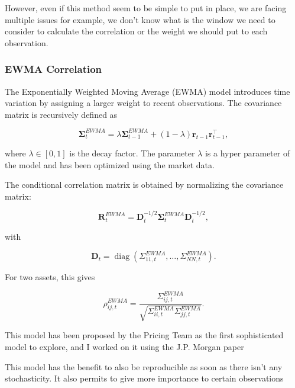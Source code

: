 \documentclass{article}
\begin{document}
However, even if this method seem to be simple to put in place, we are facing multiple issues for example, we don't know what is the window we need to consider to calculate the correlation or the weight we should put to each observation.

\subsubsection{EWMA Correlation}

The Exponentially Weighted Moving Average (EWMA) model introduces time variation by assigning a larger weight to recent observations. The covariance matrix is recursively 
defined as

\begin{equation}
\mathbf{\Sigma}_t^{EWMA}
=
\lambda\mathbf{\Sigma}_{t-1}^{EWMA}
+
(1-\lambda)
\bm{r}_{t-1}\bm{r}_{t-1}^{\top},
\end{equation}

where $\lambda\in[0,1]$ is the decay factor. The parameter $\lambda$ is a hyper parameter of the model and has been optimized using the market data.

The conditional correlation matrix is obtained by normalizing the covariance matrix:

\begin{equation}
\mathbf{R}_t^{EWMA}
=
\mathbf{D}_t^{-1/2}
\mathbf{\Sigma}_t^{EWMA}
\mathbf{D}_t^{-1/2},
\end{equation}

with

\begin{equation}
\mathbf{D}_t
=
\operatorname{diag}
\left(
\Sigma_{11,t}^{EWMA},
\ldots,
\Sigma_{NN,t}^{EWMA}
\right).
\end{equation}

For two assets, this gives

\begin{equation}
\rho_{ij,t}^{EWMA}
=
\frac{
\Sigma_{ij,t}^{EWMA}
}{
\sqrt{
\Sigma_{ii,t}^{EWMA}
\Sigma_{jj,t}^{EWMA}
}
}.
\end{equation}

This model has been proposed by the Pricing Team as the first sophisticated model to explore, and I worked on it using the J.P. Morgan paper \cite{JP Morgan EWMA}

This model has the benefit to also be reproducible as soon as there isn't any stochasticity. It also permits to give more importance to certain observations
\end{document}
